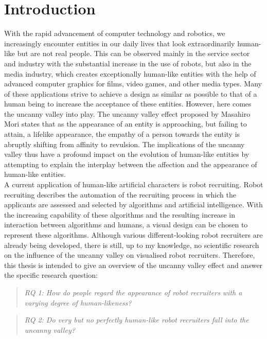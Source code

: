 \chapter{Introduction}
With the rapid advancement of computer technology and robotics, we increasingly encounter entities in our daily lives that look extraordinarily human-like but are not real people. This can be observed mainly in the service sector and industry with the substantial increase in the use of robots, but also in the media industry, which creates exceptionally human-like entities with the help of advanced computer graphics for films, video games, and other media types. Many of these applications strive to achieve a design as similar as possible to that of a human being to increase the acceptance of these entities. However, here comes the uncanny valley into play. The uncanny valley effect proposed by Masahiro Mori \cite{original_masahiro} states that as the appearance of an entity is approaching, but failing to attain, a lifelike appearance, the empathy of a person towards the entity is abruptly shifting from affinity to revulsion. The implications of the uncanny valley thus have a profound impact on the evolution of human-like entities by attempting to explain the interplay between the affection and the appearance of human-like entities.\\
A current application of human-like artificial characters is robot recruiting. Robot recruiting describes the automation of the recruiting process in which the applicants are assessed and selected by algorithms and artificial intelligence. With the increasing capability of these algorithms and the resulting increase in interaction between algorithms and humans, a visual design can be chosen to represent these algorithms.
Although various different-looking robot recruiters are already being developed, there is still, up to my knowledge, no scientific research on the influence of the uncanny valley on visualised robot recruiters.\newpage
Therefore, this thesis is intended to give an overview of the uncanny valley effect and answer the specific research question:

\begin{quote}\emph{RQ 1: How do people regard the appearance of robot recruiters with a varying degree of human-likeness?}\end{quote} 

\begin{quote}\emph{RQ 2: Do very but no perfectly human-like robot recruiters fall into the uncanny valley?}\end{quote} 

